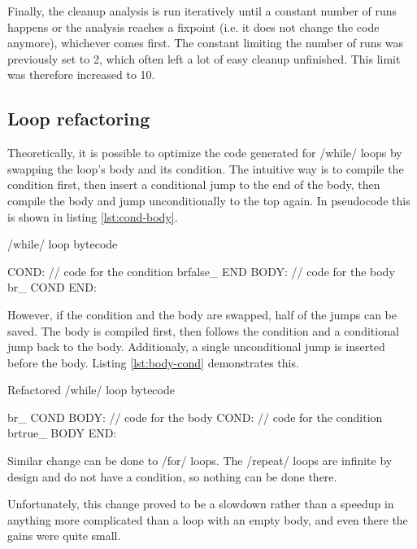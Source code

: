 Finally, the cleanup analysis is run iteratively until a constant number of runs happens or the analysis reaches a fixpoint (i.e. it does not change the code anymore), whichever comes first. The constant limiting the number of runs was previously set to 2, which often left a lot of easy cleanup unfinished. This limit was therefore increased to 10.


\subsection{Loop refactoring}

Theoretically, it is possible to optimize the code generated for \rinline/while/ loops by swapping the loop's body and its condition. The intuitive way is to compile the condition first, then insert a conditional jump to the end of the body, then compile the body and jump unconditionally to the top again. In pseudocode this is shown in listing \ref{lst:cond-body}.

\begin{listing}[htbp]
  \caption{\label{lst:cond-body}\rinline/while/ loop bytecode}
  \begin{ccode}
COND:
    // code for the condition
    brfalse_ END
BODY:
    // code for the body
    br_ COND
END:
  \end{ccode}
\end{listing}

However, if the condition and the body are swapped, half of the jumps can be saved. The body is compiled first, then follows the condition and a conditional jump back to the body. Additionaly, a single unconditional jump is inserted before the body. Listing \ref{lst:body-cond} demonstrates this.

\begin{listing}[htbp]
  \caption{\label{lst:body-cond}Refactored \rinline/while/ loop bytecode}
  \begin{ccode}
    br_ COND
BODY:
    // code for the body
COND:
    // code for the condition
    brtrue_ BODY
END:
  \end{ccode}
\end{listing}

Similar change can be done to \rinline/for/ loops. The \rinline/repeat/ loops are infinite by design and do not have a condition, so nothing can be done there.

Unfortunately, this change proved to be a slowdown rather than a speedup in anything more complicated than a loop with an empty body, and even there the gains were quite small.

